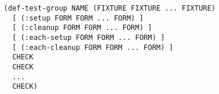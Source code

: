 \begin{verbatim}
  (def-test-group NAME (FIXTURE FIXTURE ... FIXTURE)
    [ (:setup FORM FORM ... FORM) ]
    [ (:cleanup FORM FORM ... FORM) ]
    [ (:each-setup FORM FORM ... FORM) ]
    [ (:each-cleanup FORM FORM ... FORM) ]
    CHECK
    CHECK
    ...
    CHECK)
\end{verbatim}
